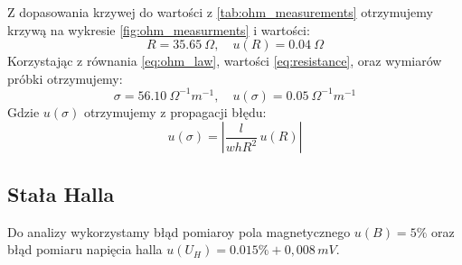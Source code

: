 \documentclass[12pt]{article}
\begin{document}
Z dopasowania krzywej do wartości z \ref{tab:ohm_measurements} otrzymujemy krzywą na wykresie \ref{fig:ohm_measurments} i wartości:
\begin{equation}
    R = 35.65 \ \Omega, \quad  u(R) = 0.04 \ \Omega
    \label{eq:resistance}
\end{equation}
Korzystając z równania \ref{eq:ohm_law}, wartości \ref{eq:resistance}, oraz wymiarów próbki otrzymujemy:
\begin{equation}
    \sigma = 56.10 \ \Omega^{-1}m^{-1}, \quad u(\sigma) = 0.05 \ \Omega^{-1}m^{-1}
    \label{eq:final_conductivity}
\end{equation}
Gdzie $u(\sigma)$ otrzymujemy z propagacji błędu:
\[
    u(\sigma) = |\frac{l}{whR^2} \, u(R)|
\]

\subsection{Stała Halla}
Do analizy wykorzystamy błąd pomiaroy pola magnetycznego\cite{magnetometer} $u(B) = 5\%$ oraz błąd pomiaru napięcia halla \cite{multimeter_big} $u(U_H) = 0.015\%+0{,}008\,mV$.
\end{document}
